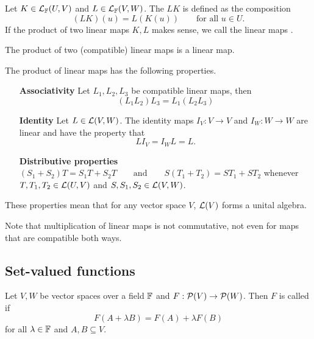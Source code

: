 \begin{definition}
Let $K\in \operatorname{\mathcal{L}}_\mathbb{F}(U,V)$ and $L\in \operatorname{\mathcal{L}}_\mathbb{F}(V,W)$. The  $LK$ is defined as the composition
\[ (LK)(u) = L(K(u)) \qquad \text{for all $u\in U$.} \]
If the product of two linear maps $K,L$ makes sense, we call the linear maps .
\end{definition}
\begin{proposition}
The product of two (compatible) linear maps is a linear map.
\end{proposition}
\begin{proposition}
The product of linear maps has the following properties. 
\begin{itemize}[leftmargin=4.2cm]
\item[\textbf{Associativity}] Let $L_1, L_2, L_3$ be compatible linear maps, then
\[ (L_1L_2)L_3 = L_1(L_2L_3) \]
\item[\textbf{Identity}] Let $L\in \operatorname{\mathcal{L}}(V,W)$. The identity maps $I_V:V\to V$ and $I_W:W\to W$ are linear and have the property that
\[ LI_V = I_W L = L. \]
\item[\textbf{Distributive properties}]
$ (S_1+S_2)T = S_1T + S_2T \qquad \text{and} \qquad S(T_1 + T_2) = ST_1 + ST_2 $
whenever $T,T_1, T_2 \in \operatorname{\mathcal{L}}(U,V)$ and $S,S_1, S_2\in \operatorname{\mathcal{L}}(V,W)$.
\end{itemize}
These properties mean that for any vector space $V$, $\operatorname{\mathcal{L}}(V)$ forms a unital algebra.
\end{proposition}
Note that multiplication of linear maps is not commutative, not even for maps that are compatible both ways.

\subsection{Set-valued functions}
\begin{definition}
Let $V,W$ be vector spaces over a field $\mathbb{F}$ and $F: \operatorname{\mathcal{P}}(V)\to \operatorname{\mathcal{P}}(W)$. Then $F$ is called  if
\[ F(A+\lambda B) = F(A) + \lambda F(B) \]
for all $\lambda \in \mathbb{F}$ and $A,B\subseteq V$.
\end{definition}

